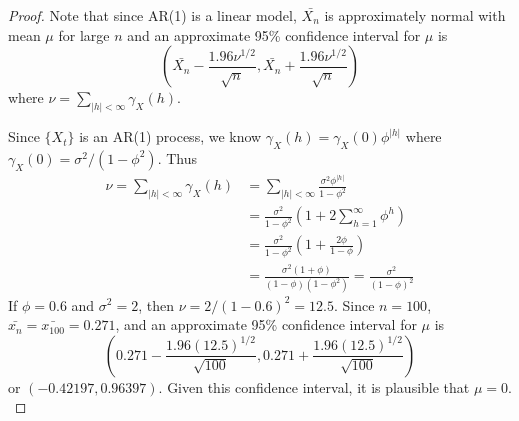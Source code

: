 \documentclass[12pt]{article}
\theoremstyle{definition}
\begin{document}
\begin{proof}
  Note that since AR(1) is a linear model, $\bar{X_n}$ is approximately normal
  with mean $\mu$ for large $n$ and an approximate 95\% confidence interval for
  $\mu$ is
  \[
    \left(\bar{X_n} - \frac{1.96\nu^{1/2}}{\sqrt{n}}, \bar{X_n} + \frac{1.96\nu^{1/2}}{\sqrt{n}}\right)
  \]
  where $\nu = \sum_{|h|<\infty}\gamma_X(h)$.

  Since $\{X_t\}$ is an AR(1) process, we know $\gamma_X(h) = \gamma_X(0)\phi^{|h|}$
  where $\gamma_X(0) = \sigma^2 / (1 - \phi^2)$. Thus
  \begin{align*}
    \nu = \sum_{|h| < \infty} \gamma_X(h)
    &= \sum_{|h| < \infty} \frac{\sigma^2 \phi^{|h|}}{1 - \phi^2} \\
    &= \frac{\sigma ^ 2}{1 - \phi^2} \left(1 + 2\sum_{h=1}^\infty\phi^h\right) \\
    &= \frac{\sigma ^ 2}{1 - \phi^2} \left(1 + \frac{2\phi}{1-\phi}\right) \\
    &= \frac{\sigma ^ 2(1+\phi)}{(1-\phi)(1 - \phi^2)} = \frac{\sigma ^ 2}{(1-\phi)^2}
  \end{align*}
  If $\phi = 0.6$ and $\sigma^2 = 2$, then $\nu = 2 / (1 - 0.6)^2 = 12.5$. Since $n=100$,
  $\bar{x_n} = \bar{x_{100}} = 0.271$, and an approximate 95\% confidence interval
  for $\mu$ is
  \[
    \left(0.271 - \frac{1.96(12.5)^{1/2}}{\sqrt{100}}, 0.271 + \frac{1.96(12.5)^{1/2}}{\sqrt{100}}\right)
  \]
  or $(-0.42197, 0.96397)$. Given this confidence interval, it is plausible that
  $\mu = 0.$
\end{proof}
\end{document}
